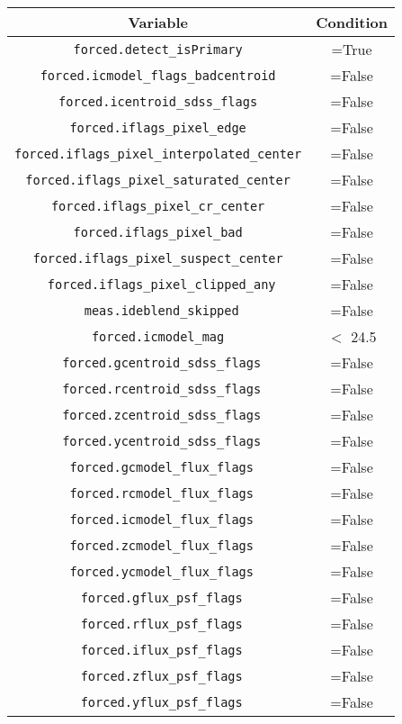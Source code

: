 \documentclass[a4paper,11pt]{article}
\begin{document}
\begin{table}
\centering
\begin{tabular}{|c|c|}
\hline
 Variable & Condition \\
 \hline
 \texttt{forced.detect\_isPrimary} & =True\\
  \texttt{forced.icmodel\_flags\_badcentroid} & =False\\
  \texttt{forced.icentroid\_sdss\_flags} & =False\\
  \texttt{forced.iflags\_pixel\_edge} & =False\\
  \texttt{forced.iflags\_pixel\_interpolated\_center} & =False\\
  \texttt{forced.iflags\_pixel\_saturated\_center} & =False\\
  \texttt{forced.iflags\_pixel\_cr\_center} & =False\\
  \texttt{forced.iflags\_pixel\_bad} & =False\\
  \texttt{forced.iflags\_pixel\_suspect\_center} & =False\\
   \texttt{ forced.iflags\_pixel\_clipped\_any} & =False\\
   \texttt{ meas.ideblend\_skipped} & =False\\
   \texttt{forced.icmodel\_mag} & $<$ 24.5\\ %
   \hline %
   \texttt{ forced.gcentroid\_sdss\_flags} & =False\\
   \texttt{ forced.rcentroid\_sdss\_flags} & =False\\
   \texttt{ forced.zcentroid\_sdss\_flags} & =False\\
   \texttt{ forced.ycentroid\_sdss\_flags} & =False\\
   \texttt{ forced.gcmodel\_flux\_flags} & =False\\
   \texttt{ forced.rcmodel\_flux\_flags} & =False\\
   \texttt{ forced.icmodel\_flux\_flags} & =False\\
   \texttt{ forced.zcmodel\_flux\_flags} & =False\\
   \texttt{ forced.ycmodel\_flux\_flags} & =False\\
   \texttt{ forced.gflux\_psf\_flags} & =False\\
   \texttt{ forced.rflux\_psf\_flags} & =False\\
   \texttt{ forced.iflux\_psf\_flags} & =False\\
   \texttt{ forced.zflux\_psf\_flags} & =False\\
   \texttt{ forced.yflux\_psf\_flags} & =False\\

\end{tabular}
\end{table}
\end{document}
